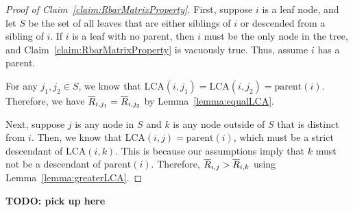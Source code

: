 \documentclass{article}
\theoremstyle{definition}
\begin{document}
\begin{proof}[Proof of Claim~\ref{claim:RbarMatrixProperty}]
First, suppose $i$ is a leaf node, and let $S$ be the set of all leaves that are either siblings of $i$ or descended from a sibling of $i$.
If $i$ is a leaf with no parent, then $i$ must be the only node in the tree, and Claim~\ref{claim:RbarMatrixProperty} is vacuously true.
Thus, assume $i$ has a parent.

For any $j_1, j_2 \in S$, we know that $\text{LCA}(i, j_1) = \text{LCA}(i, j_2) = \text{parent}(i)$.
Therefore, we have $\overline{R}_{i,j_1} = \overline{R}_{i,j_2}$ by Lemma~\ref{lemma:equalLCA}.

Next, suppose $j$ is any node in $S$ and $k$ is any node outside of $S$ that is distinct from $i$.
Then, we know that $\text{LCA}(i,j) = \text{parent}(i)$, which must be a strict descendant of $\text{LCA}(i,k)$.
This is because our assumptions imply that $k$ must not be a descendant of $\text{parent}(i)$.
Therefore, $\overline{R}_{i,j} > \overline{R}_{i,k}$ using Lemma~\ref{lemma:greaterLCA}.
\end{proof}

\par {\bf TODO: pick up here} \par

\newcommand{\DeltaMin}{\Delta_{\text{min}}}
\newcommand{\deltaMin}{\delta_{\text{min}}}
\newcommand{\alphaMax}{\alpha_{\text{max}}}
\newcommand{\LCA}{\text{LCA}}
\end{document}
